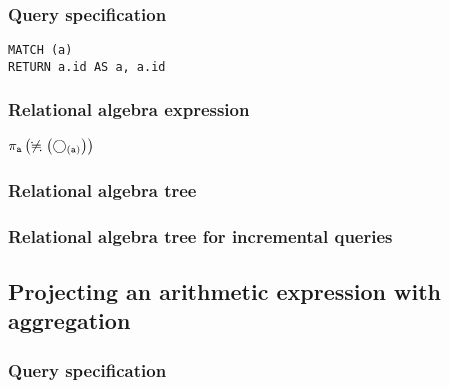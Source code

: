 \subsubsection*{Query specification}

\begin{lstlisting}
MATCH (a)
RETURN a.id AS a, a.id
\end{lstlisting}

\subsubsection*{Relational algebra expression}

$\projection{\var{a}} \left(\alldifferent{} \left(\getvertices{a}{}\right)\right)$

\subsubsection*{Relational algebra tree}


\subsubsection*{Relational algebra tree for incremental queries}


\subsection{Projecting an arithmetic expression with aggregation}

\subsubsection*{Query specification}

